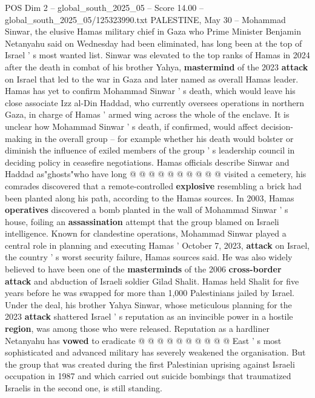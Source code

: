 \begin{textsample}{POS Dim 2 – global\_south\_2025\_05 – Score 14.00 – global\_south\_2025\_05/125323990.txt}  \label{ex:f2_pos_296}
PALESTINE, May 30 -- Mohammad Sinwar, the elusive Hamas military chief in Gaza who Prime Minister Benjamin Netanyahu said on Wednesday had been eliminated, has long been at the top of Israel ' s most wanted list.
Sinwar was elevated to the top ranks of Hamas in 2024 after the death in combat of his brother Yahya, \textbf{mastermind} of the 2023 \textbf{attack} on Israel that led to the war in Gaza and later named as overall Hamas leader.
Hamas has yet to confirm Mohammad Sinwar ' s death, which would leave his close associate Izz al-Din Haddad, who currently oversees operations in northern Gaza, in charge of Hamas ' armed wing across the whole of the enclave.
It is unclear how Mohammad Sinwar ' s death, if confirmed, would affect decision-making in the overall group -- for example whether his death would bolster or diminish the influence of exiled members of the group ' s leadership council in deciding policy in ceasefire negotiations.
Hamas officials describe Sinwar and Haddad as"ghosts"who have long @ @ @ @ @ @ @ @ @ @ visited a cemetery, his comrades discovered that a remote-controlled \textbf{explosive} resembling a brick had been planted along his path, according to the Hamas sources.
In 2003, Hamas \textbf{operatives} discovered a bomb planted in the wall of Mohammad Sinwar ' s house, foiling an \textbf{assassination} attempt that the group blamed on Israeli intelligence.
Known for clandestine operations, Mohammad Sinwar played a central role in planning and executing Hamas ' October 7, 2023, \textbf{attack} on Israel, the country ' s worst security failure, Hamas sources said.
He was also widely believed to have been one of the \textbf{masterminds} of the 2006 \textbf{cross-border} \textbf{attack} and abduction of Israeli soldier Gilad Shalit.
Hamas held Shalit for five years before he was swapped for more than 1,000 Palestinians jailed by Israel.
Under the deal, his brother Yahya Sinwar, whose meticulous planning for the 2023 \textbf{attack} shattered Israel ' s reputation as an invincible power in a hostile \textbf{region}, was among those who were released.
Reputation as a hardliner Netanyahu has \textbf{vowed} to eradicate @ @ @ @ @ @ @ @ @ @ East ' s most sophisticated and advanced military has severely weakened the organisation.
But the group that was created during the first Palestinian uprising against Israeli occupation in 1987 and which carried out suicide bombings that traumatized Israelis in the second one, is still standing.

\end{textsample}
